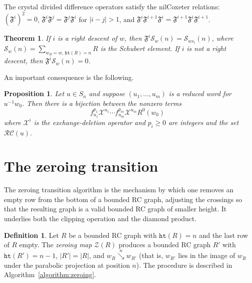 \documentclass{amsart}
\newtheorem{proposition}[lemma]{Proposition}
\newtheorem{theorem}{Theorem}[section]
\theoremstyle{definition}
\newtheorem{definition}[lemma]{Definition}
\theoremstyle{remark}
\numberwithin{equation}{section}
\newcommand{\RC}{\mathcal{RC}}
\newcommand{\wof}[1]{w_{#1}}
\newcommand{\hr}{\mathtt{ht}}
\newcommand{\zeromap}{\mathcal{Z}}
\newcommand{\rcdd}{\mathfrak{F}}
\newcommand{\downvar}[1]{\stackrel{#1}{\searrow}}
\newcommand{\code}{\mathfrak{c}}
\begin{document}
The crystal divided difference operators satisfy the nilCoxeter relations: $(\rcdd^i)^2 = 0$, $\rcdd^i \rcdd^j = \rcdd^j \rcdd^i$ for $|i - j| > 1$, and $\rcdd^i \rcdd^{i+1} \rcdd^i = \rcdd^{i+1} \rcdd^i \rcdd^{i+1}$.

\begin{theorem}\label{theorem:divdiff-schubert}
If $i$ is a right descent of $w$, then $\rcdd^i \mathcal{S}_w(n) = \mathcal{S}_{ws_i}(n)$, where $\mathcal{S}_w(n) = \sum_{\wof{R} = w,\, \hr(R) = n} R$ is the Schubert element.  If $i$ is not a right descent, then $\rcdd^i \mathcal{S}_w(n) = 0$.
\end{theorem}

An important consequence is the following.

\begin{proposition}
Let $u\in S_n$ and suppose $(u_1,\ldots,u_m)$ is a reduced word for $u^{-1}w_0$. Then there is a bijection between the nonzero terms
$$f_{u_1}^{p_1}\mathcal{X}^{u_1}\cdots f_{u_m}^{p_m}\mathcal{X}^{u_m}R^0(w_0)$$
where $\mathcal{X}^i$ is the exchange-deletion operator and $p_i\geq 0$ are integers and the set $\RC(u)$. 
\end{proposition}




\section{The zeroing transition}\label{section:zeroing}

The zeroing transition algorithm is the mechanism by which one removes an empty row from the bottom of a bounded RC graph, adjusting the crossings so that the resulting graph is a valid bounded RC graph of smaller height.  It underlies both the clipping operation and the diamond product.

\begin{definition}\label{definition:zeroing}
Let $R$ be a bounded RC graph with $\hr(R) = n$ and the last row of $R$ empty.  The \textit{zeroing map} $\zeromap(R)$ produces a bounded RC graph $R'$ with $\hr(R') = n - 1$, $|R'| = |R|$, and $\wof{R} \downvar{n} \wof{R'}$ (that is, $\wof{R'}$ lies in the image of $\wof{R}$ under the parabolic projection at position $n$).  The procedure is described in Algorithm~\ref{algorithm:zeroing}.
\end{definition}
\end{document}
